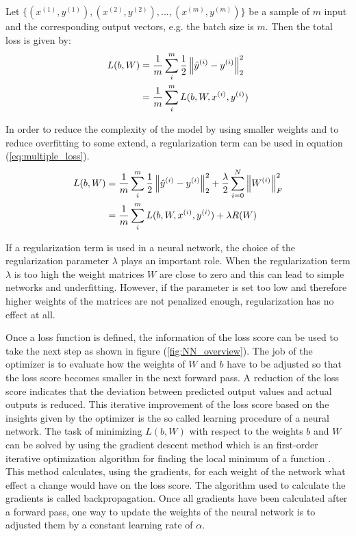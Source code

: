 \begin{definition}\label{def:batch_loss}
	Let $\{(x^{(1)}, y^{(1)}), (x^{(2)}, y^{(2)}), ..., (x^{(m)}, y^{(m)})\}$ be a sample of $m$ input and the corresponding output vectors, e.g. the batch size is $m$. Then the total loss is given by:	
	\begin{equation}\label{eq:multiple_loss}
	\begin{aligned}
	L(b, W) &= \frac{1}{m} \sum_i^m \frac{1}{2} \left\lVert\hat{y}^{(i)} - y^{(i)}\right\rVert^2_2 \\
			&= \frac{1}{m} \sum_i^m L(b, W, x^{(i)}, y^{(i)})
	\end{aligned}
	\end{equation}
\end{definition}

\begin{remark} \label{rem:regularization}
	In order to reduce the complexity of the model by using smaller weights and to reduce overfitting to some extend, a regularization term can be used in equation (\ref{eq:multiple_loss}).
	\begin{equation}\label{eq:multiple_loss_regularization}
	\begin{aligned}
	L(b, W) &= \frac{1}{m} \sum_i^m \frac{1}{2} \left\lVert\hat{y}^{(i)} - y^{(i)}\right\rVert^2_2 + \frac{\lambda}{2} \sum_{i=0}^{N} \left\lVert W^{(i)}\right\rVert_F^2\\
	&= \frac{1}{m} \sum_i^m L(b, W, x^{(i)}, y^{(i)}) + \lambda R(W)
	\end{aligned}
	\end{equation}
\end{remark}

If a regularization term is used in a neural network, the choice of the regularization parameter $\lambda$ plays an important role. When the regularization term $\lambda$ is too high the weight matrices $W$ are close to zero and this can lead to simple networks and underfitting. However, if the parameter is set too low and therefore higher weights of the matrices are not penalized enough, regularization has no effect at all.

Once a loss function is defined, the information of the loss score can be used to take the next step as shown in figure (\ref{fig:NN_overview}). The job of the optimizer is to evaluate how the weights of $W$ and $b$ have to be adjusted so that the loss score becomes smaller in the next forward pass. A reduction of the loss score indicates that the deviation between predicted output values and actual outputs is reduced. This iterative improvement of the loss score based on the insights given by the optimizer is the so called learning procedure of a neural network. The task of minimizing $L(b, W)$ with respect to the weights $b$ and $W$ can be solved by using the gradient descent method which is an  first-order iterative optimization algorithm for finding the local minimum of a function \cite{gradient_desc}. This method calculates, using the gradients, for each weight of the network what effect a change would have on the loss score. The algorithm used to calculate the gradients is called backpropagation. Once all gradients have been calculated after a forward pass, one way to update the weights of the neural network is to adjusted them by a constant learning rate of $\alpha$. 


